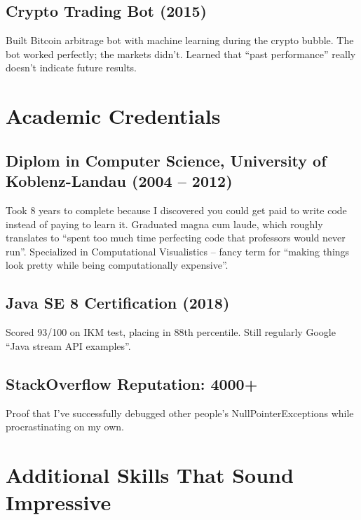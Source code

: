 \documentclass[10pt,a4paper]{article}
\begin{document}
\subsection*{Crypto Trading Bot (2015)}
Built Bitcoin arbitrage bot with machine learning during the crypto bubble. The bot worked perfectly; the markets didn't. Learned that ``past performance'' really doesn't indicate future results.

\vfill

\newpage

\section*{Academic Credentials}

\subsection*{Diplom in Computer Science, University of Koblenz-Landau (2004 -- 2012)}
Took 8 years to complete because I discovered you could get paid to write code instead of paying to learn it. Graduated magna cum laude, which roughly translates to ``spent too much time perfecting code that professors would never run''. Specialized in Computational Visualistics -- fancy term for ``making things look pretty while being computationally expensive''.

\subsection*{Java SE 8 Certification (2018)}
Scored 93/100 on IKM test, placing in 88th percentile. Still regularly Google ``Java stream API examples''.

\subsection*{StackOverflow Reputation: 4000+}
Proof that I've successfully debugged other people's NullPointerExceptions while procrastinating on my own.

\section*{Additional Skills That Sound Impressive}
\end{document}
